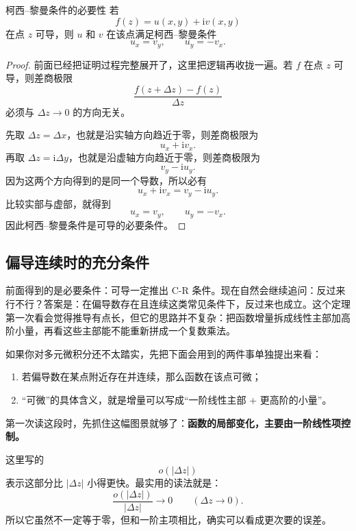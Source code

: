 \begin{dingli}{柯西--黎曼条件的必要性}{}
若
\[
    f(z)=u(x,y)+\mathrm{i}v(x,y)
\]
在点 $z$ 可导，则 $u$ 和 $v$ 在该点满足柯西--黎曼条件
\[
    u_x=v_y,\qquad u_y=-v_x.
\]
\end{dingli}

\begin{proof}
前面已经把证明过程完整展开了，这里把逻辑再收拢一遍。若 $f$ 在点 $z$ 可导，则差商极限
\[
    \frac{f(z+\Delta z)-f(z)}{\Delta z}
\]
必须与 $\Delta z\to 0$ 的方向无关。

先取 $\Delta z=\Delta x$，也就是沿实轴方向趋近于零，则差商极限为
\[
    u_x+\mathrm{i}v_x.
\]
再取 $\Delta z=\mathrm{i}\Delta y$，也就是沿虚轴方向趋近于零，则差商极限为
\[
    v_y-\mathrm{i}u_y.
\]
因为这两个方向得到的是同一个导数，所以必有
\[
    u_x+\mathrm{i}v_x=v_y-\mathrm{i}u_y.
\]
比较实部与虚部，就得到
\[
    u_x=v_y,\qquad u_y=-v_x.
\]
因此柯西--黎曼条件是可导的必要条件。
\end{proof}

\subsection{偏导连续时的充分条件}

前面得到的是必要条件：可导一定推出 C-R 条件。现在自然会继续追问：反过来行不行？答案是：在偏导数存在且连续这类常见条件下，反过来也成立。这个定理第一次看会觉得推导有点长，但它的思路并不复杂：把函数增量拆成线性主部加高阶小量，再看这些主部能不能重新拼成一个复数乘法。

\begin{tishi}
如果你对多元微积分还不太踏实，先把下面会用到的两件事单独提出来看：
\begin{enumerate}
    \item 若偏导数在某点附近存在并连续，那么函数在该点可微；
    \item ``可微''的具体含义，就是增量可以写成``一阶线性主部 + 更高阶的小量''。
\end{enumerate}
第一次读这段时，先抓住这幅图景就够了：\textbf{函数的局部变化，主要由一阶线性项控制。}
\end{tishi}

\begin{tishi}
这里写的
    \[
        o(|\Delta z|)
    \]
表示这部分比 $|\Delta z|$ 小得更快。最实用的读法就是：
\[
    \frac{o(|\Delta z|)}{|\Delta z|}\to 0\qquad (\Delta z\to 0).
\]
所以它虽然不一定等于零，但和一阶主项相比，确实可以看成更次要的误差。
\end{tishi}

